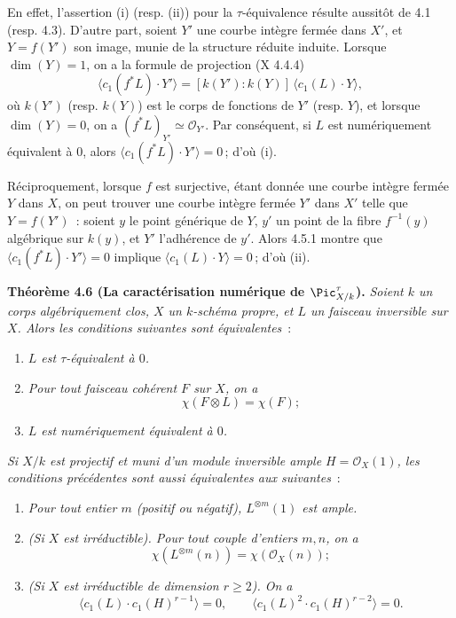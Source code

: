En effet, l'assertion (i) (resp. (ii)) pour la \(\tau\)-\'equivalence r\'esulte aussit\^ot de 4.1 (resp. 4.3). D'autre part, soient \(Y'\) une courbe int\`egre ferm\'ee dans \(X'\), et \(Y=f(Y')\) son image, munie de la structure r\'eduite induite. Lorsque \(\dim(Y)=1\), on a la formule de projection (X 4.4.4)
\[
  \tag{4.5.1}
  \langle c_1(f^*L)\cdot Y'\rangle
  =[k(Y'):k(Y)]\,\langle c_1(L)\cdot Y\rangle,
\]
o\`u \(k(Y')\) (resp. \(k(Y)\)) est le corps de fonctions de \(Y'\) (resp. \(Y\)), et lorsque \(\dim(Y)=0\), on a \((f^*L)_{Y'}\simeq\mathcal O_{Y'}\). Par cons\'equent, si \(L\) est num\'eriquement \'equivalent \`a \(0\), alors \(\langle c_1(f^*L)\cdot Y'\rangle=0\)\,; d'o\`u (i).

R\'eciproquement, lorsque \(f\) est surjective, \'etant donn\'ee une courbe int\`egre ferm\'ee \(Y\) dans \(X\), on peut trouver une courbe int\`egre ferm\'ee \(Y'\) dans \(X'\) telle que \(Y=f(Y')\)~: soient \(y\) le point g\'en\'erique de \(Y\), \(y'\) un point de la fibre \(f^{-1}(y)\) alg\'ebrique sur \(k(y)\), et \(Y'\) l'adh\'erence de \(y'\). Alors 4.5.1 montre que \(\langle c_1(f^*L)\cdot Y'\rangle=0\) implique \(\langle c_1(L)\cdot Y\rangle=0\)\,; d'o\`u (ii).

\textbf{Th\'eor\`eme 4.6 (La caract\'erisation num\'erique de \(\Pic^\tau_{X/k}\)).} \emph{Soient \(k\) un corps alg\'ebriquement clos, \(X\) un \(k\)-sch\'ema propre, et \(L\) un faisceau inversible sur \(X\). Alors les conditions suivantes sont \'equivalentes}~:
\begin{enumerate}[label=(\roman*)]
\item \emph{\(L\) est \(\tau\)-\'equivalent \`a \(0\).}
\item \emph{Pour tout faisceau coh\'erent \(F\) sur \(X\), on a}
\[
  \chi(F\otimes L)=\chi(F);
\]
\item
\emph{\(L\) est num\'eriquement \'equivalent \`a \(0\).}
\end{enumerate}
\emph{Si \(X/k\) est projectif et muni d'un module inversible ample \(H=\mathcal O_X(1)\), les conditions pr\'ec\'edentes sont aussi \'equivalentes aux suivantes}~:
\begin{enumerate}[label=(\roman*),start=4]
\item \emph{Pour tout entier \(m\) (positif ou n\'egatif), \(L^{\otimes m}(1)\) est ample.}
\item \emph{(Si \(X\) est irr\'eductible). Pour tout couple d'entiers \(m,n\), on a}
\[
  \chi(L^{\otimes m}(n))=\chi(\mathcal O_X(n));
\]
\item \emph{(Si \(X\) est irr\'eductible de dimension \(r\ge2\)). On a}
\[
  \langle c_1(L)\cdot c_1(H)^{r-1}\rangle=0,\qquad
  \langle c_1(L)^2\cdot c_1(H)^{r-2}\rangle=0.
\]
\end{enumerate}

